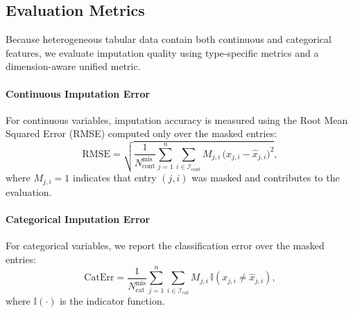 \documentclass[times, review, 10pt]{elsarticle}
\begin{document}




\subsection{Evaluation Metrics}

Because heterogeneous tabular data contain both continuous and categorical
features, we evaluate imputation quality using type-specific metrics and a
dimension-aware unified metric.

\paragraph{Continuous Imputation Error}
For continuous variables, imputation accuracy is measured using the Root
Mean Squared Error (RMSE) computed only over the masked entries:
\[
\mathrm{RMSE}
=
\sqrt{
\frac{1}{N_{\mathrm{cont}}^{\mathrm{mis}}}
\sum_{j=1}^{n}
\sum_{i \in \mathcal{I}_{\mathrm{cont}}}
M_{j,i}\,\big(x_{j,i} - \hat{x}_{j,i}\big)^{2}
},
\]
where \(M_{j,i}=1\) indicates that entry \((j,i)\) was masked and contributes
to the evaluation.

\paragraph{Categorical Imputation Error}
For categorical variables, we report the classification error over the masked
entries:
\[
\mathrm{CatErr}
=
\frac{1}{N_{\mathrm{cat}}^{\mathrm{mis}}}
\sum_{j=1}^{n}
\sum_{i \in \mathcal{I}_{\mathrm{cat}}}
M_{j,i}\,\mathbb{I}(x_{j,i} \neq \hat{x}_{j,i}),
\]
where \(\mathbb{I}(\cdot)\) is the indicator function.
\end{document}
